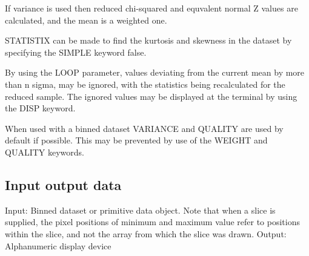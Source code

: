 \documentclass{book}
\renewcommand{\_}{{\tt\char'137}}     %
\begin{document}
If variance is used then reduced chi-squared and equvalent normal
Z values are calculated, and the mean is a weighted one.
 
STATISTIX can be made to find the kurtosis and skewness in the
dataset by specifying the SIMPLE keyword false.
 
By using the LOOP parameter, values deviating from the current
mean by more than n sigma, may be ignored, with the statistics
being recalculated for the reduced sample. The ignored values
may be displayed at the terminal by using the DISP keyword.
 
When used with a binned dataset VARIANCE and QUALITY are used by
default if possible. This may be prevented by use of the WEIGHT
and QUALITY keywords.
 
\subsection{Input output data}
Input: Binned dataset or primitive data object. Note that when a
slice is supplied, the pixel positions of minimum and
maximum value refer to positions within the slice, and not
the array from which the slice was drawn.
Output: Alphanumeric display device
\end{document}
